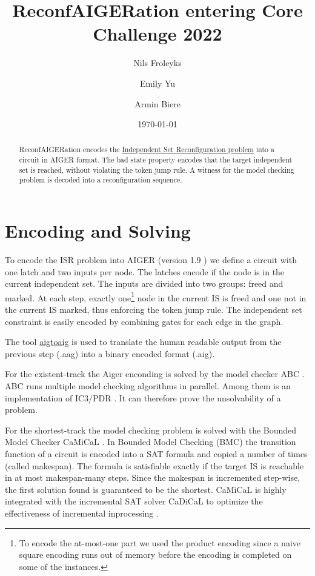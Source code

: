 \documentclass[11pt]{article}
\author{Nils Froleyks}
\date{\today}
\title{ReconfAIGERation entering Core Challenge 2022}
\begin{document}
\author[1]{Emily Yu}
\author[2]{Armin Biere}
\maketitle

\begin{abstract}
ReconfAIGERation encodes the \href{https://core-challenge.github.io/2022/\#the-independent-set-reconfiguration-isr-problem}{Independent Set Reconfiguration problem} into a circuit in AIGER format. The bad state property encodes that the target independent set is reached, without violating the token jump rule. A witness for the model checking problem is decoded into a reconfiguration sequence.
\end{abstract}
\section*{Encoding and Solving}
\label{sec:org71e5b64}
To encode the ISR problem into AIGER (version 1.9 \autocite{Biere-FMV-TR-11-2}) we define a circuit with one latch and two inputs per node. The latches encode if the node is in the current independent set. The inputs are divided into two groups: freed and marked. At each step, exactly one\footnote{To encode the at-most-one part we used the product encoding \autocite{chenNewSATEncoding2010} since a naive square encoding runs out of memory before the encoding is completed on some of the instances.} node in the current IS is freed and one not in the current IS marked, thus enforcing the token jump rule. The independent set constraint is easily encoded by combining gates for each edge in the graph.

The tool \href{https://github.com/arminbiere/aiger}{aigtoaig} is used to translate the human readable output from the previous step (.aag) into a binary encoded format (.aig).

For the existent-track the Aiger enconding is solved by the model checker ABC \autocite{braytonABCAcademicIndustrialStrength2010}. ABC runs multiple model checking algorithms in parallel. Among them is an implementation of IC3/PDR \autocite{bradleySATBasedModelChecking2011}. It can therefore prove the unsolvability of a problem.

For the shortest-track the model checking problem is solved with the Bounded Model Checker CaMiCaL \autocite{fazekasIncrementalInprocessingSAT2019}. In Bounded Model Checking (BMC) the transition function of a circuit is encoded into a SAT formula and copied a number of times (called makespan).
The formula is satisfiable exactly if the target IS is reachable in at most makespan-many steps. Since the makespan is incremented step-wise, the first solution found is guaranteed to be the shortest.
CaMiCaL is highly integrated with the incremental SAT solver CaDiCaL \autocite{biereEnteringSATCompetition2020} to optimize the effectiveness of incremental inprocessing \autocite{fazekasIncrementalInprocessingSAT2019}.
\end{document}
